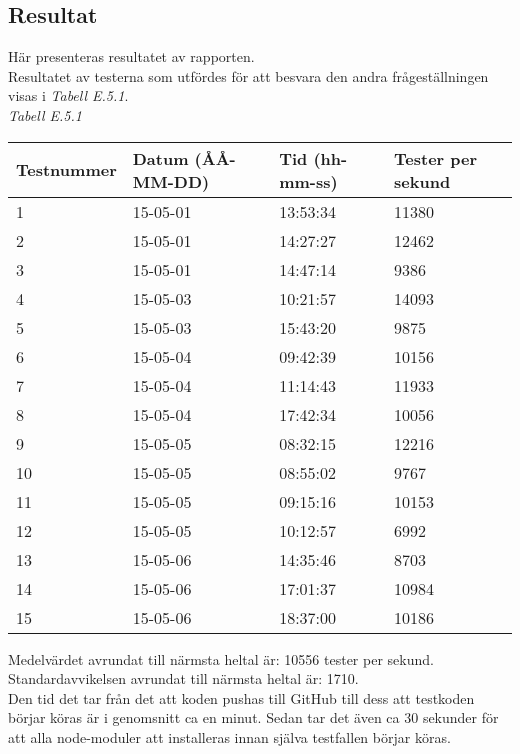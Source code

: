 \subsection{Resultat}
Här presenteras resultatet av rapporten.\\

Resultatet av testerna som utfördes för att besvara den andra frågeställningen
visas i \emph{Tabell E.5.1}.\\

\noindent\emph{Tabell E.5.1}
\begin{center}
  \begin{tabular}{| l | l | l | l |}
  \hline
  Testnummer & Datum (ÅÅ-MM-DD) & Tid (hh-mm-ss) & Tester per sekund\\ \hline
  1 & 15-05-01 & 13:53:34 & 11380\\ \hline
  2 & 15-05-01 & 14:27:27 & 12462\\ \hline
  3 & 15-05-01 & 14:47:14 & 9386\\ \hline 
  4 & 15-05-03 & 10:21:57 & 14093\\ \hline 
  5 & 15-05-03 & 15:43:20 & 9875\\ \hline 
  6 & 15-05-04 & 09:42:39 & 10156\\ \hline 
  7 & 15-05-04 & 11:14:43 & 11933\\ \hline 
  8 & 15-05-04 & 17:42:34 & 10056\\ \hline 
  9 & 15-05-05 & 08:32:15 & 12216\\ \hline 
  10 & 15-05-05 & 08:55:02 & 9767\\ \hline 
  11 & 15-05-05 & 09:15:16 & 10153\\ \hline 
  12 & 15-05-05 & 10:12:57 & 6992\\ \hline 
  13 & 15-05-06 & 14:35:46 & 8703\\ \hline 
  14 & 15-05-06 & 17:01:37 & 10984\\ \hline 
  15 & 15-05-06 & 18:37:00 & 10186\\ \hline 
  \end{tabular}
\end{center}

Medelvärdet avrundat till närmsta heltal är: 10556 tester per sekund.\\

Standardavvikelsen avrundat till närmsta heltal är: 1710.\\

Den tid det tar från det att koden pushas till GitHub till dess att 
testkoden börjar köras är i genomsnitt ca en minut. Sedan tar det även ca 30
sekunder för att alla node-moduler att installeras innan själva
testfallen börjar köras.\\

